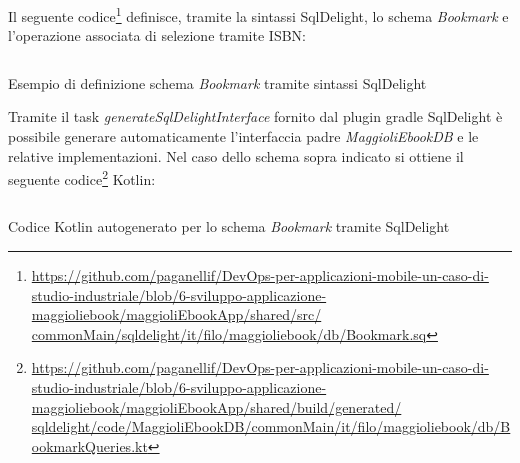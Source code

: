 Il seguente codice\footnote{\href{https://github.com/paganellif/DevOps-per-applicazioni-mobile-un-caso-di-studio-industriale/blob/6-sviluppo-applicazione-maggioliebook/maggioliEbookApp/shared/src/commonMain/sqldelight/it/filo/maggioliebook/db/Bookmark.sq}{https://github.com/paganellif/DevOps-per-applicazioni-mobile-un-caso-di-studio-industriale/blob/6-sviluppo-applicazione-maggioliebook/maggioliEbookApp/shared/src/\\commonMain/sqldelight/it/filo/maggioliebook/db/Bookmark.sq}} definisce,
tramite la sintassi SqlDelight,
lo schema \textit{Bookmark} e l'operazione associata di selezione tramite ISBN:

\begin{listing}[H]
    \inputminted{sql}{code/bookmark-sqldelight.sq}
    \caption{Esempio di definizione schema \textit{Bookmark} tramite sintassi SqlDelight}
\end{listing}

Tramite il task \textit{generateSqlDelightInterface} fornito dal plugin gradle SqlDelight è possibile generare automaticamente l'interfaccia padre \textit{MaggioliEbookDB} e le relative implementazioni. 
Nel caso dello schema sopra indicato si ottiene il seguente codice\footnote{\href{https://github.com/paganellif/DevOps-per-applicazioni-mobile-un-caso-di-studio-industriale/blob/6-sviluppo-applicazione-maggioliebook/maggioliEbookApp/shared/build/generated/sqldelight/code/MaggioliEbookDB/commonMain/it/filo/maggioliebook/db/BookmarkQueries.kt}{https://github.com/paganellif/DevOps-per-applicazioni-mobile-un-caso-di-studio-industriale/blob/6-sviluppo-applicazione-maggioliebook/maggioliEbookApp/shared/build/generated/\\sqldelight/code/MaggioliEbookDB/commonMain/it/filo/maggioliebook/db/BookmarkQueries.kt}} Kotlin:

\begin{listing}[H]
    \inputminted{kotlin}{code/bookmark-sqldelight.kt}
    \caption{Codice Kotlin autogenerato per lo schema \textit{Bookmark} tramite SqlDelight}
\end{listing}

